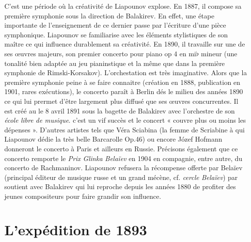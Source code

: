 C'est une période où la créativité de Liapounov explose. En 1887, il compose sa première symphonie sous la direction de Balakirev. En effet, une étape importante de l'enseignement de ce dernier passe par l'écriture d'une pièce symphonique. Liapounov se familiarise avec les éléments stylistiques de son maître ce qui influence durablement sa créativité. En 1890, il travaille sur une de ses œuvres majeurs, son premier concerto pour piano op 4 en mi$\flat$ mineur (une tonalité bien adaptée au jeu pianinstique et la même que dans la première symphonie de Rimski-Korsakov). L'orchestation est très imaginative. Alors que la première symphonie peine à se faire connaitre (création en 1888, publication en 1901, rares exécutions), le concerto paraît à Berlin dés le milieu des années 1890 ce qui lui prermet d'être largement plus diffusé que ses œuvres concurrentes. Il est créé au le 8 avril 1891 sous la bagette de Balakirev avec l'orchestre de son \emph{école libre de musique}. c'est un vif succès et le concert « couvre plus ou moins les dépenses ». D'autres artistes tels que Véra Sciabina (la femme de Scriabine à qui Liapounov dédie la très belle Barcarolle Op.46) ou encore Józef Hofmann donneront le concerto à Paris et ailleurs en Russie. Précisons également que ce concerto remporte le \emph{Prix Glinka Belaïev} en 1904 en compagnie, entre autre, du concerto  de Rachmaninov. Liapounov refusera la récompense offerte par Belaïev (principal éditeur de musique russe et un grand mécène, cf. \emph{cercle Belaïev}) par soutient avec Balakirev qui lui reproche depuis les années 1880 de profiter des jeunes compositeurs pour faire grandir son influence.\\

\section{L'expédition de 1893}

